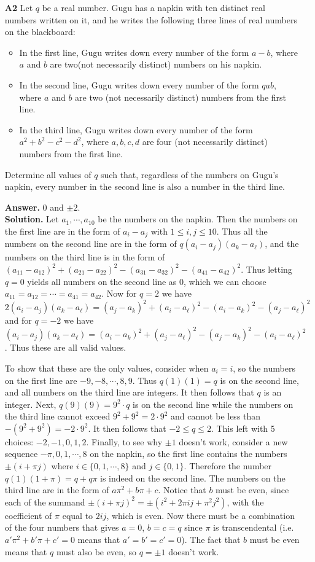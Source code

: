 \documentclass[11pt,a4paper]{article}
\begin{document}
\begin{enumerate}
\item [\textbf{A2}] Let $q$ be a real number. Gugu has a napkin with ten distinct real numbers written on it, and he writes the following three lines of real numbers on the blackboard:
	\begin{itemize}
		\item In the first line, Gugu writes down every number of the form $a-b$, where $a$ and $b$ are two(not necessarily distinct) numbers on his napkin.
		\item In the second line, Gugu writes down every number of the form $qab$, where $a$ and $b$ are
		two (not necessarily distinct) numbers from the first line.
		\item In the third line, Gugu writes down every number of the form $a^2+b^2-c^2-d^2$, where
		$a, b, c, d$ are four (not necessarily distinct) numbers from the first line.
	\end{itemize}
	Determine all values of $q$ such that, regardless of the numbers on Gugu's napkin, every number in the second line is also a number in the third line.
	
	\textbf{Answer.} $0$ and $\pm 2$. \\
	\textbf{Solution.} Let $a_1, \cdots , a_{10}$ be the numbers on the napkin. Then the numbers on the first line are in the form of $a_i - a_j$ with $1\le i, j\le 10$. Thus all the numbers on the second line are in the form of $q(a_i - a_j)(a_k-a_\ell)$, and the numbers on the third line is in the form of $(a_{11}-a_{12})^2 + (a_{21}-a_{22})^2 - (a_{31}-a_{32})^2 - (a_{41}-a_{42})^2$. Thus letting $q=0$ yields all numbers on the second line as 0, which we can choose $a_{11}=a_{12}=\cdots = a_{41}=a_{42}$. Now for $q=2$ we have 
	$2(a_i - a_j)(a_k-a_\ell)=(a_j-a_k)^2 + (a_i-a_\ell)^2 - (a_i-a_k)^2 - (a_j-a_\ell)^2$ and for $q=-2$ we have 
	$(a_i - a_j)(a_k-a_\ell)= (a_i-a_k)^2 + (a_j-a_\ell)^2 - (a_j-a_k)^2 - (a_i-a_\ell)^2$. Thus these are all valid values. 
	
	To show that these are the only values, consider when $a_i=i$, so the numbers on the first line are $-9, -8, \cdots , 8, 9$. Thus $q(1)(1)=q$ is on the second line, and all numbers on the third line are integers. It then follows that $q$ is an integer. Next, $q(9)(9)=9^2\cdot q$ is on the second line while the numbers on the third line cannot exceed $9^2+9^2=2\cdot 9^2$ and cannot be less than $-(9^2+9^2)=-2\cdot 9^2$. It then follows that $-2\le q\le 2$. This left with 5 choices: $-2, -1, 0, 1, 2$. Finally, to see why $\pm 1$ doesn't work, consider a new sequence $-\pi, 0, 1, \cdots , 8$ on the napkin, so the first line contains the numbers $\pm(i + \pi j)$ where $i\in \{0, 1, \cdots , 8\}$ and $j\in\{0, 1\}$. Therefore the number $q(1)(1+\pi)=q+q\pi$ is indeed on the second line. The numbers on the third line are in the form of $a\pi^2+b\pi + c$. Notice that $b$ must be even, since each of the summand $\pm (i+\pi j)^2=\pm (i^2+2\pi ij + \pi^2 j^2)$, with the coefficient of $\pi$ equal to $2ij$, which is even. Now there must be a combination of the four numbers that gives $a=0$, $b=c=q$ since $\pi$ is transcendental (i.e. $a'\pi^2+b'\pi+c'=0$ means that $a'=b'=c'=0$). The fact that $b$ must be even means that $q$ must also be even, so $q=\pm 1$ doesn't work. 
	

\end{enumerate}
\end{document}
